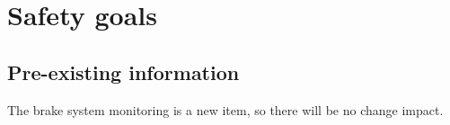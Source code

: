 \section{Safety goals}
%
%
% 

\subsection{Pre-existing information}
%
The brake system monitoring is a new item, so there will be no change impact.

%
%
%
%
%
%
